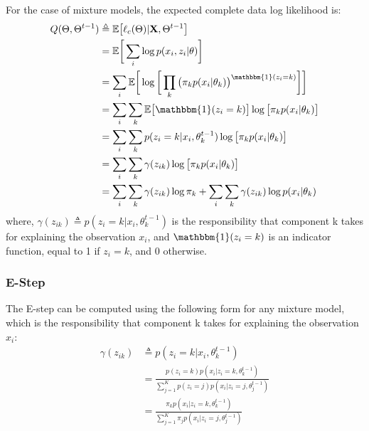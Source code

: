 For the case of mixture models, the expected complete data log likelihood is:
\begin{equation} \label{log-lik-expected-derivation-f-mm}
	\begin{aligned}
		Q(\Theta, \Theta^{t-1}) & \triangleq \mathbb{E} \big[\ell_{c}(\Theta) | \mathbf{X}, \Theta^{t-1}\big] \\
								& = \mathbb{E} \bigg[ \sum_{i} \log p(x_{i}, z_{i}|\theta) \bigg] \\
								& = \sum_{i} \mathbb{E} \bigg[ \log \bigg[\prod_{k} \big( \pi_{k}p(x_{i}|\theta_{k})\big)^{\mathbbm{1}(z_{i}=k)} \bigg]\bigg] \\
								& = \sum_{i} \sum_{k} \mathbb{E} \big[\mathbbm{1}(z_{i}=k)\big] \log \big[\pi_{k}p(x_{i}|\theta_{k})\big] \\
								& = \sum_{i} \sum_{k} p(z_{i}=k|x_{i},\theta_{k}^{t-1}) \log \big[\pi_{k}p(x_{i}|\theta_{k})\big] \\
								& = \sum_{i} \sum_{k} \gamma(z_{ik}) \log \big[\pi_{k}p(x_{i}|\theta_{k})\big] \\
								& = \sum_{i} \sum_{k} \gamma(z_{ik}) \log \pi_{k} + \sum_{i} \sum_{k} \gamma(z_{ik}) \log p(x_{i}|\theta_{k}) \\		
	\end{aligned}
\end{equation}
where, $\gamma(z_{ik}) \triangleq p(z_{i}=k|x_{i},\theta_{k}^{t-1})$ is the responsibility that component k takes for explaining the observation $x_{i}$, and $\mathbbm{1}(z_{i}=k)$ is an indicator function, equal to 1 if $z_{i}=k$, and 0 otherwise.

\subsubsection{E-Step}
The E-step can be computed using the following form for any mixture model, which is the responsibility that component k takes for explaining the observation $x_{i}$:
\begin{equation} \label{responsibilities-f-mm}
  \begin{aligned}
	\gamma(z_{ik}) & \triangleq p(z_{i}=k|x_{i},\theta_{k}^{t-1}) \\
				   & = \frac{p(z_{i}=k)p(x_{i}|z_{i}=k,\theta_{k}^{t-1})}{\sum\limits_{j=1}^{K} p(z_{i}=j)p(x_{i}|z_{i}=j,\theta_{j}^{t-1})} \\
				   & = \frac{\pi_{k}p(x_{i}|z_{i}=k,\theta_{k}^{t-1})}{\sum\limits_{j=1}^{K} \pi_{j}p(x_{i}|z_{i}=j,\theta_{j}^{t-1})}
  \end{aligned}
\end{equation}

